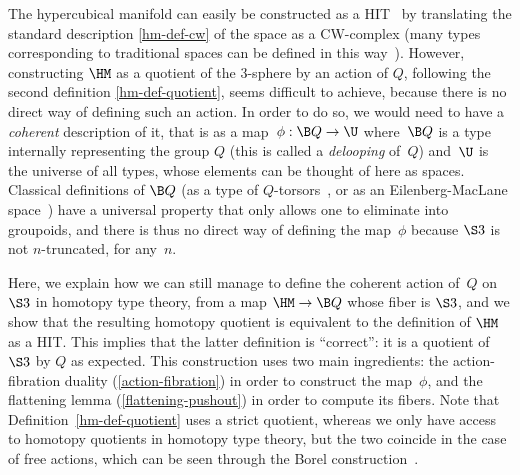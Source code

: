 \documentclass[a4paper]{article}
\newcommand{\citep}{\cite}
\begin{document}
The hypercubical manifold can easily be constructed as a HIT~\citep{dylan} by translating the standard description \cref{hm-def-cw} of the space as a CW-complex (many types corresponding to traditional spaces can be defined in this way~\cite[Section 2.4]{vezzosi2021cubical}).
%
However, constructing $\HM$ as a quotient of the 3-sphere by an action of $Q$, following the second definition \cref{hm-def-quotient}, seems difficult to achieve, because there is no direct way of defining such an action. In order to do so, we would need to have a \emph{coherent} description of it, that is as a map~$\phi:\B Q\to\U$ where $\B Q$ is a type internally representing the group $Q$ (this is called a \emph{delooping} of~$Q$) and~$\U$ is the universe of all types, whose elements can be thought of here as spaces. Classical definitions of $\B Q$ (as a type of $Q$-torsors~\citep{warn2023eilenberg}, or as an Eilenberg-MacLane space~\citep{licata2014eilenberg}) have a universal property that only allows one to eliminate into groupoids, and there is thus no direct way of defining the map~$\phi$ because $\S3$ is not $n$-truncated, for any~$n$.


Here, we explain how we can still manage to define the coherent action of $Q$ on $\S3$ in homotopy type theory, from a map $\HM\to\B Q$ whose fiber is $\S3$, and we show that the resulting homotopy quotient is equivalent to the definition of $\HM$ as a HIT. This implies that the latter definition is ``correct'': it is a quotient of $\S3$ by $Q$ as expected. This construction uses two main ingredients: the action-fibration duality (\cref{action-fibration}) in order to construct the map~$\phi$, and the flattening lemma (\cref{flattening-pushout}) in order to compute its fibers. Note that Definition~\ref{hm-def-quotient} uses a strict quotient, whereas we only have access to homotopy quotients in homotopy type theory, but the two coincide in the case of free actions, which can be seen through the Borel construction~\cite[Section 2.2]{adem2002topics}.
\end{document}
